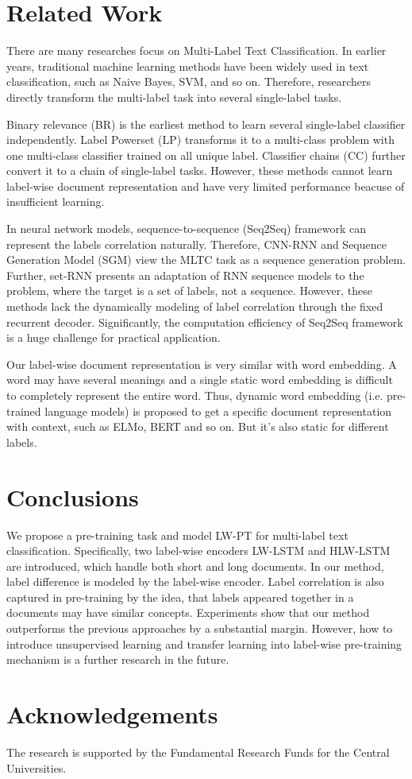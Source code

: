 \documentclass[runningheads]{llncs}
\begin{document}
\section{Related Work}
There are many researches focus on Multi-Label Text Classification. In earlier years, traditional machine learning methods have been widely used in text classification, such as Naive Bayes, SVM, and so on. Therefore, researchers directly transform the multi-label task into several single-label tasks.

Binary relevance (BR) \cite{boutell2004learning} is the earliest method to learn several single-label classifier independently. Label Powerset (LP)\cite{tsoumakas2007multi} transforms it to a multi-class problem with one multi-class classifier trained on all unique label. Classifier chains (CC) \cite{read2011classifier} further convert it to a chain of single-label tasks. However, these methods cannot learn label-wise document representation and have very limited performance beacuse of insufficient learning.

In neural network models, sequence-to-sequence (Seq2Seq) framework can represent the labels correlation naturally. Therefore, CNN-RNN \cite{chen2017ensemble} and Sequence Generation Model (SGM)\cite{yang2018sgm} view the MLTC task as a sequence generation problem. Further, set-RNN\cite{qin2019adapting} presents an adaptation of RNN sequence models to the problem, where the target is a set of labels, not a sequence. However, these methods lack the dynamically modeling of label correlation through the fixed recurrent decoder. Significantly, the computation efficiency of Seq2Seq framework is a huge challenge for practical application.

Our label-wise document representation is very similar with word embedding. A word may have several meanings and a single static word embedding is difficult to completely represent the entire word. Thus, dynamic word embedding (i.e. pre-trained language models) is proposed to get a specific document representation with context, such as ELMo\cite{peters2018deep}, BERT\cite{devlin2018bert} and so on. But it's also static for different labels.

\section{Conclusions}
We propose a pre-training task and model LW-PT for multi-label text classification. Specifically, two label-wise encoders LW-LSTM and HLW-LSTM are introduced, which handle both short and long documents. In our method, label difference is modeled by the label-wise encoder. Label correlation is also captured in pre-training by the idea, that labels appeared together in a documents may have similar concepts. Experiments show that our method outperforms the previous approaches by a substantial margin. However, how to introduce unsupervised learning and transfer learning into label-wise pre-training mechanism is a further research in the future.

\section*{Acknowledgements}
The research is supported by the Fundamental Research Funds for the Central Universities.



\end{document}
